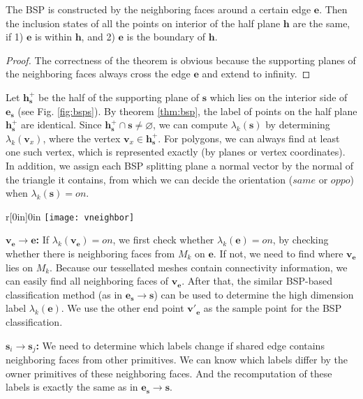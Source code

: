 \begin{theorem}
  \label{thm:bsp}
  The BSP is constructed by the neighboring faces around a certain edge $\bm{e}$. Then the inclusion states of all the points on interior of the half plane $\bm{h}$ are the same, if 1) $\bm{e}$ is within $\bm{h}$, and 2) $\bm{e}$ is the boundary of $\bm{h}$.
\end{theorem}
\begin{proof}
  The correctness of the theorem is obvious because the supporting planes of the neighboring faces always cross the edge $\bm{e}$ and extend to infinity.
\end{proof}

Let $\bm{h}_{\bm{s}}^+$ be the half of the supporting plane of $\bm{s}$ which lies on the interior side of $\bm{e}_{\bm{s}}$ (see Fig. \ref{fig:bsps}). By theorem \ref{thm:bsp}, the label of points on the half plane $\bm{h}_{\bm{s}}^+$ are identical.
Since $\bm{h}_{\bm{s}}^+ \cap \bm{s} \neq \varnothing$, we can compute $\lambda_k(\bm{s})$ by determining $\lambda_k(\bm{v}_x)$, where the vertex $\bm{v}_x \in \bm{h}_{\bm{s}}^+$. For polygons, we can always find at least one such vertex, which is represented exactly (by planes or vertex coordinates). In addition, we assign each BSP splitting plane a normal vector by the normal of the triangle it contains, from which we can decide the orientation ($same$ or $oppo$) when $\lambda_k(\bm{s})=on$.


\vspace{0.5em}
\begin{wrapfigure}{r}[0in]{0in}
 \texttt{[image: vneighbor]}
\end{wrapfigure}
\noindent\textbf{$\bm{\bm{v}_{\bm{e}}\to e}$: }If $\lambda_k(\bm{v}_{\bm{e}})=on$, we first check whether $\lambda_k(\bm{e}) = on$, by checking whether there is neighboring faces from $M_k$ on $\bm{e}$. If not, we need to find where $\bm{v}_{\bm{e}}$ lies on $M_k$.
Because our tessellated meshes contain connectivity information, we can easily find all neighboring faces of $\bm{v}_{\bm{e}}$.
After that, the similar BSP-based classification method (as in ${\bm{e}_{\bm{s}}\to \bm{s}}$) can be used to determine the high dimension label $\lambda_k(\bm{e})$. We use the other end point $\bm{v}'_{\bm{e}}$ as the sample point for the BSP classification.


\vspace{0.5em}
\noindent\textbf{$\bm{s}_i\to \bm{s}_j$: } We need to determine which labels change if shared edge contains neighboring faces from other primitives. We can know which labels differ by the owner primitives of these neighboring faces. And the recomputation of these labels is exactly the same as in $\bm{\bm{e}_{\bm{s}}\to \bm{s}}$.


